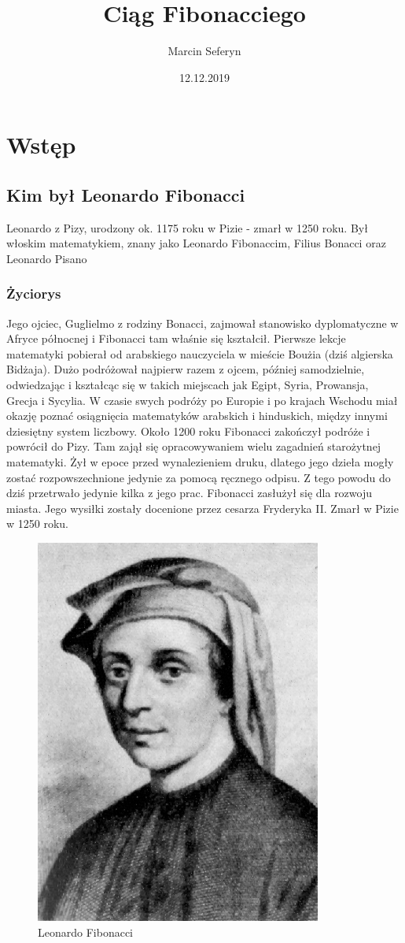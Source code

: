 \documentclass{report}
\title{Ciąg Fibonacciego}
\author{Marcin Seferyn}
\date{12.12.2019}
\begin{document}
\maketitle
\newpage
\tableofcontents
\newpage
\chapter{Wstęp}
\section{Kim był Leonardo Fibonacci}
\cite{fib}
Leonardo z Pizy, urodzony ok. 1175 roku w Pizie - zmarł w 1250 roku. Był włoskim matematykiem, znany jako Leonardo Fibonaccim, Filius Bonacci oraz Leonardo Pisano
\subsection{Życiorys}
\cite{fib2}
Jego ojciec, Guglielmo z rodziny Bonacci, zajmował stanowisko dyplomatyczne w Afryce północnej i Fibonacci tam właśnie się kształcił. Pierwsze lekcje matematyki pobierał od arabskiego nauczyciela w mieście Boużia (dziś algierska Bidżaja). Dużo podróżował najpierw razem z ojcem, później samodzielnie, odwiedzając i kształcąc się w takich miejscach jak Egipt, Syria, Prowansja, Grecja i Sycylia. W czasie swych podróży po Europie i po krajach Wschodu miał okazję poznać osiągnięcia matematyków arabskich i hinduskich, między innymi dziesiętny system liczbowy.
Około 1200 roku Fibonacci zakończył podróże i powrócił do Pizy.
Tam zajął się opracowywaniem wielu zagadnień starożytnej matematyki. Żył w epoce przed wynalezieniem druku, dlatego jego dzieła mogły zostać rozpowszechnione jedynie za pomocą ręcznego odpisu. Z tego powodu do dziś przetrwało jedynie kilka z jego prac.
Fibonacci zasłużył się dla rozwoju miasta. Jego wysiłki zostały docenione przez cesarza Fryderyka II. Zmarł w Pizie w 1250 roku.


\begin{figure}[h]
\center
\includegraphics[scale=0.6]{fibo}
\caption{Leonardo Fibonacci}
\end{figure}
\newpage
\end{document}
